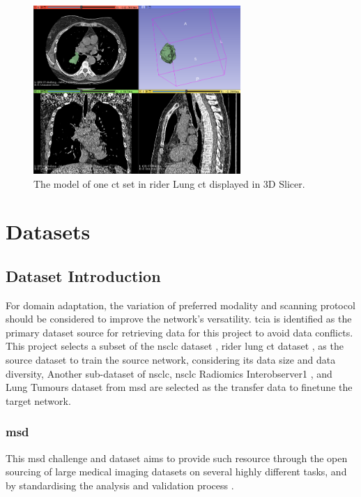 \documentclass[11pt,times,oneside,openright]{eeereport}
\begin{document}
\begin{figure}[h]
    \centering
    \includegraphics[width=0.7\textwidth]{fig/introduction/3dslicer.png}
    \caption{The model of one \acrshort{ct} set in \acrshort{rider} Lung \acrshort{ct} displayed in 3D Slicer.}
    \label{fig:3dslicer}
\end{figure}

\chapter{Datasets}\label{cpt:dataset}

\section{Dataset Introduction}

For domain adaptation, the variation of preferred modality and scanning protocol should be considered to improve the network's versatility. \acrfull{tcia} \cite{Clark2013} is identified as the primary dataset source for retrieving data for this project to avoid data conflicts. This project selects a subset of the \acrfull{nsclc} dataset \cite{aerts2014decoding}, \acrfull{rider} lung \acrshort{ct} dataset \cite{zhao2015data}, as the source dataset to train the source network, considering its data size and data diversity, Another sub-dataset of \acrshort{nsclc}, \acrshort{nsclc} Radiomics Interobserver1 \cite{wee2019data}, and Lung Tumours dataset from \acrfull{msd} \cite{antonelli2021medical} are selected as the transfer data to finetune the target network.

\subsection{\acrlong{msd}}
 This \acrfull{msd} challenge and dataset aims to provide such resource through the open sourcing of large medical imaging datasets on several highly different tasks, and by standardising the analysis and validation process \cite{antonelli2021medical}. 
 
\end{document}
